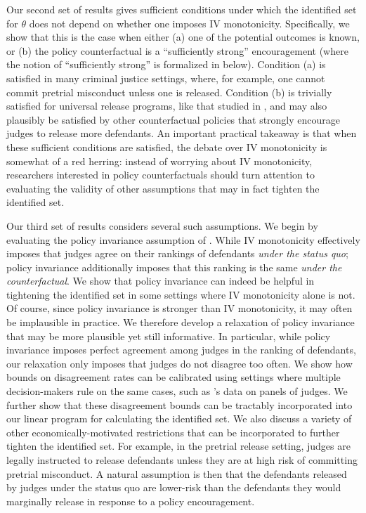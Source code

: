 \documentclass[12pt]{article}%
\theoremstyle{definition}
\newcommand\1{\operatorname{I}\indicatorfence}
\begin{document}
Our second set of results gives sufficient conditions under which the
identified set for $\theta$ does not depend on whether one imposes IV
monotonicity. Specifically, we show that this is the case when either (a) one of
the potential outcomes is known, or (b) the policy counterfactual is a
``sufficiently strong'' encouragement (where the notion of ``sufficiently
strong'' is formalized in
 below). Condition
(a) is satisfied in many criminal justice settings, where, for example, one
cannot commit pretrial misconduct unless one is released. Condition (b) is
trivially satisfied for universal release programs, like that studied in
\textcite{albright22}, and may also plausibly be satisfied by other
counterfactual policies that strongly encourage judges to release more
defendants. An important practical takeaway is that when these sufficient
conditions are satisfied, the debate over IV monotonicity is somewhat of a red
herring: instead of worrying about IV monotonicity, researchers interested in
policy counterfactuals should turn attention to evaluating the validity of other
assumptions that may in fact tighten the identified set.

Our third set of results considers several such assumptions. We begin by
evaluating the policy invariance assumption of \textcite{HeVy05}. While
\ac{IV} monotonicity effectively imposes that judges agree on their rankings of
defendants \emph{under the status quo}; policy invariance additionally imposes
that this ranking is the same \emph{under the counterfactual}. We show that
policy invariance can indeed be helpful in tightening the identified set in some
settings where IV monotonicity alone is not. Of course, since policy invariance is
stronger than IV monotonicity, it may often be implausible in practice. We
therefore develop a relaxation of policy invariance that may be more plausible yet still informative.
In particular, while policy invariance imposes perfect agreement among judges in
the ranking of defendants, our relaxation only imposes that judges do not
disagree too often. We show how bounds on disagreement rates can be calibrated
using settings where multiple decision-makers rule on the same cases, such as \textcite{sigstad_monotonicity_2023}'s data on panels of judges. We
further show that these disagreement bounds can be tractably incorporated into
our linear program for calculating the identified set. We also discuss a variety
of other economically-motivated restrictions that can be incorporated to further
tighten the identified set. For example, in the pretrial release setting, judges
are legally instructed to release defendants unless they are at high risk of
committing pretrial misconduct. A natural assumption is then that the defendants
released by judges under the status quo are lower-risk than the defendants they
would marginally release in response to a policy encouragement.
\end{document}
